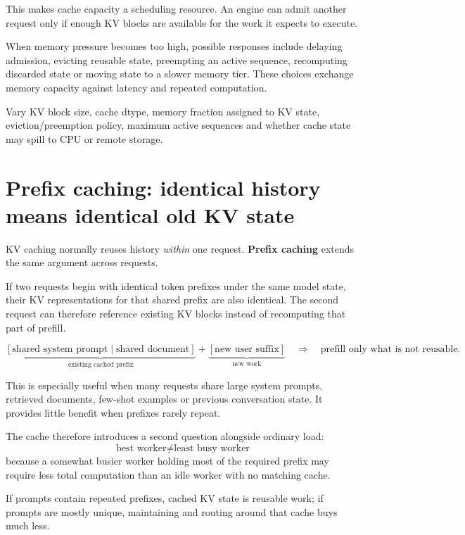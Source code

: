 This makes cache capacity a scheduling resource.
An engine can admit another request only if enough KV blocks are available for the work it expects to execute.

When memory pressure becomes too high, possible responses include delaying admission, evicting reusable state, preempting an active sequence, recomputing discarded state or moving state to a slower memory tier.
These choices exchange memory capacity against latency and repeated computation.

\begin{calloutdegreeofexperiment}
Vary KV block size, cache dtype, memory fraction assigned to KV state, eviction/preemption policy, maximum active sequences and whether cache state may spill to CPU or remote storage.
\end{calloutdegreeofexperiment}


\section{Prefix caching: identical history means identical old KV state}
\label{sec:inference-prefix-cache}
KV caching normally reuses history \emph{within} one request.
\textbf{Prefix caching} extends the same argument across requests.

If two requests begin with identical token prefixes under the same model state, their KV representations for that shared prefix are also identical.
The second request can therefore reference existing KV blocks instead of recomputing that part of prefill.

\[
\underbrace{
[\text{shared system prompt}\mid\text{shared document}]
}_{\text{existing cached prefix}}
+
\underbrace{[\text{new user suffix}]}_{\text{new work}}
\quad\Rightarrow\quad
\text{prefill only what is not reusable}.
\]

This is especially useful when many requests share large system prompts, retrieved documents, few-shot examples or previous conversation state.
It provides little benefit when prefixes rarely repeat.

The cache therefore introduces a second question alongside ordinary load:
\[
\boxed{
\text{best worker}
\neq
\text{least busy worker}
}
\]
because a somewhat busier worker holding most of the required prefix may require less total computation than an idle worker with no matching cache.

\begin{calloutbias}
If prompts contain repeated prefixes, cached KV state is reusable work; if prompts are mostly unique, maintaining and routing around that cache buys much less.
\end{calloutbias}


